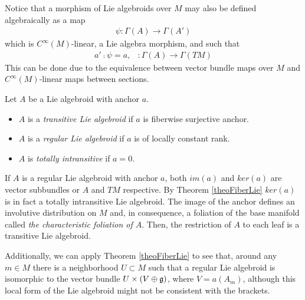 \begin{remark}
Notice that a morphism of Lie algebroids over $M$ may also be defined algebraically as a map
\begin{align*}
    \psi: \Gamma(A) \to \Gamma(A')
\end{align*}
which is $C^\infty(M)$-linear, a Lie algebra morphism, and such that
\begin{align*}
    a' \comp \psi = a, & :\Gamma(A) \to \Gamma(TM)
\end{align*}
This can be done due to the equivalence between vector bundle maps over $M$ and $C^\infty(M)$-linear maps between sections.
\end{remark}

\begin{definition}
    Let $A$ be a Lie algebroid with anchor $a$.
    
    \begin{itemize}
    
    \item $A$ is a \emph{transitive Lie algebroid} if $a$ is fiberwise surjective anchor.
    
    \item $A$ is a \emph{regular Lie algebroid} if $a$ is of locally constant rank.
    
    \item $A$ is \emph{totally intransitive} if $a = 0$.
    
    \end{itemize}
    
\end{definition}

\begin{remark}
If $A$ is a regular Lie algebroid with anchor $a$, both $im(a)$ and $ker(a)$ are vector subbundles or $A$ and $TM$ respective. By Theorem \ref{theoFiberLie} $ker(a)$ is in fact a totally intransitive Lie algebroid. The image of the anchor defines an involutive distribution on $M$ and, in consequence, a foliation of the base manifold called \emph{the characteristic foliation of $A$}. Then, the restriction of $A$ to each leaf is a transitive Lie algebroid.

Additionally, we can apply Theorem \ref{theoFiberLie} to see that, around any $m \in M$ there is a neighborhood $U \subset M$ such that a regular Lie algebroid is isomorphic to the vector bundle $U \times (V \oplus \mathfrak{g})$, where $V = a(A_m)$, although this local form of the Lie algebroid might not be consistent with the brackets.%
\end{remark}

